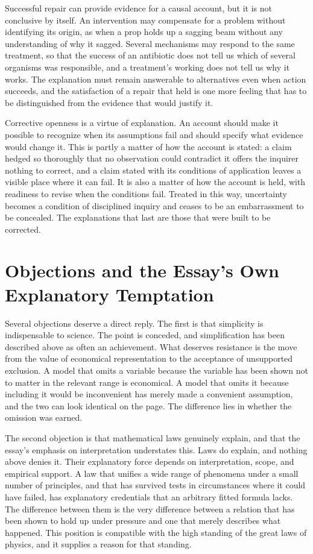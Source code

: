 \documentclass[11pt,letterpaper]{article}
\theoremstyle{definition}
\begin{document}
Successful repair can provide evidence for a causal account, but it is not conclusive by itself. An intervention may compensate for a problem without identifying its origin, as when a prop holds up a sagging beam without any understanding of why it sagged. Several mechanisms may respond to the same treatment, so that the success of an antibiotic does not tell us which of several organisms was responsible, and a treatment's working does not tell us why it works. The explanation must remain answerable to alternatives even when action succeeds, and the satisfaction of a repair that held is one more feeling that has to be distinguished from the evidence that would justify it.

Corrective openness is a virtue of explanation. An account should make it possible to recognize when its assumptions fail and should specify what evidence would change it. This is partly a matter of how the account is stated: a claim hedged so thoroughly that no observation could contradict it offers the inquirer nothing to correct, and a claim stated with its conditions of application leaves a visible place where it can fail. It is also a matter of how the account is held, with readiness to revise when the conditions fail. Treated in this way, uncertainty becomes a condition of disciplined inquiry and ceases to be an embarrassment to be concealed. The explanations that last are those that were built to be corrected.

\section{Objections and the Essay's Own Explanatory Temptation}

Several objections deserve a direct reply. The first is that simplicity is indispensable to science. The point is conceded, and simplification has been described above as often an achievement. What deserves resistance is the move from the value of economical representation to the acceptance of unsupported exclusion. A model that omits a variable because the variable has been shown not to matter in the relevant range is economical. A model that omits it because including it would be inconvenient has merely made a convenient assumption, and the two can look identical on the page. The difference lies in whether the omission was earned.

The second objection is that mathematical laws genuinely explain, and that the essay's emphasis on interpretation understates this. Laws do explain, and nothing above denies it. Their explanatory force depends on interpretation, scope, and empirical support. A law that unifies a wide range of phenomena under a small number of principles, and that has survived tests in circumstances where it could have failed, has explanatory credentials that an arbitrary fitted formula lacks. The difference between them is the very difference between a relation that has been shown to hold up under pressure and one that merely describes what happened. This position is compatible with the high standing of the great laws of physics, and it supplies a reason for that standing.
\end{document}
